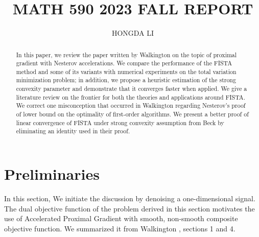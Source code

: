 \documentclass[]{article}
\title{MATH 590 2023 FALL REPORT}
\author{HONGDA LI}
\theoremstyle{definition}
\numberwithin{equation}{subsection}
\begin{document}
\maketitle

\begin{abstract}
    In this paper, we review the paper written by Walkington \cite{noel_nesterovs_nodate} on the topic of proximal gradient with Nesterov accelerations. 
    We compare the performance of the FISTA method and some of its variants with numerical experiments on the total variation minimization problem; in addition, we propose a heuristic estimation of the strong convexity parameter and demonstrate that it converges faster when applied. 
    We give a literature review on the frontier for both the theories and applications around FISTA. 
    We correct one misconception that occurred in Walkington \cite{noel_nesterovs_nodate} regarding Nesterov's proof of lower bound on the optimality of first-order algorithms.  
    We present a better proof of linear convergence of FISTA under strong convexity assumption from Beck \cite[theorem 10.7.7]{beck_first-order_nodate} by eliminating an identity used in their proof. 
\end{abstract}


\section{Preliminaries}\label{sec:preliminaries}
    In this section, We initiate the discussion by denoising a one-dimensional signal. 
    The dual objective function of the problem derived in this section motivates the use of Accelerated Proximal Gradient with smooth, non-smooth composite objective function.
    We summarized it from Walkington \cite{noel_nesterovs_nodate}, sections 1 and 4. 
\end{document}
